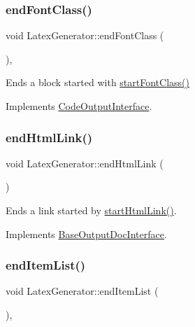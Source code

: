\subsubsection{\texorpdfstring{endFontClass()}{endFontClass()}}
{\footnotesize\ttfamily void Latex\+Generator\+::end\+Font\+Class (\begin{DoxyParamCaption}{ }\end{DoxyParamCaption})\hspace{0.3cm}{\ttfamily [inline]}, {\ttfamily [virtual]}}

Ends a block started with \mbox{\hyperlink{class_latex_generator_a8dc4dcc8aaa2a591a1fb7f06896cd5af}{start\+Font\+Class()}} 

Implements \mbox{\hyperlink{class_code_output_interface_a2b8ac05a391dae36793aa3aa8714a0f6}{Code\+Output\+Interface}}.

\mbox{\label{class_latex_generator_a28854e0713249d4ee70a0544b0ebfed5}} 
\subsubsection{\texorpdfstring{endHtmlLink()}{endHtmlLink()}}
{\footnotesize\ttfamily void Latex\+Generator\+::end\+Html\+Link (\begin{DoxyParamCaption}{ }\end{DoxyParamCaption})\hspace{0.3cm}{\ttfamily [virtual]}}

Ends a link started by \mbox{\hyperlink{class_latex_generator_a491cb262e91a3f16b37d5dd2017e2f6a}{start\+Html\+Link()}}. 

Implements \mbox{\hyperlink{class_base_output_doc_interface_afb808c1c487135d4fb2156d0675b387e}{Base\+Output\+Doc\+Interface}}.

\mbox{\label{class_latex_generator_ad126330bd7b18c670464599fdfc262ab}} 
\subsubsection{\texorpdfstring{endItemList()}{endItemList()}}
{\footnotesize\ttfamily void Latex\+Generator\+::end\+Item\+List (\begin{DoxyParamCaption}{ }\end{DoxyParamCaption})\hspace{0.3cm}{\ttfamily [inline]}, {\ttfamily [virtual]}}

